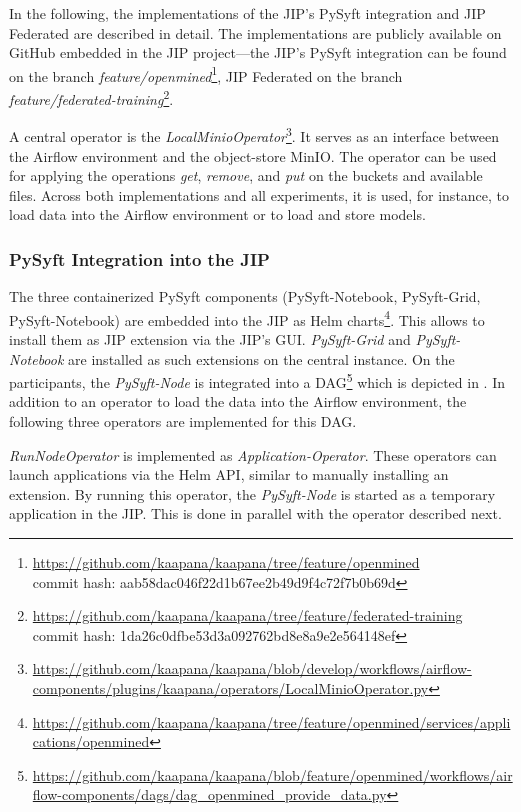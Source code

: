 In the following, the implementations of the JIP's PySyft integration and JIP Federated are described in detail.
The implementations are publicly available on GitHub embedded in the JIP project---the JIP's PySyft integration can be found on the branch \textit{feature/openmined}\footnote{\url{https://github.com/kaapana/kaapana/tree/feature/openmined}\\ commit hash: aab58dac046f22d1b67ee2b49d9f4c72f7b0b69d}, JIP Federated on the branch \textit{feature/federated-training}\footnote{\url{https://github.com/kaapana/kaapana/tree/feature/federated-training}\\ commit hash: 1da26c0dfbe53d3a092762bd8e8a9e2e564148ef}.

A central operator is the \textit{LocalMinioOperator}\footnote{\url{https://github.com/kaapana/kaapana/blob/develop/workflows/airflow-components/plugins/kaapana/operators/LocalMinioOperator.py}}. It serves as an interface between the Airflow environment and the object-store MinIO. The operator can be used for applying the operations \textit{get}, \textit{remove}, and \textit{put} on the buckets and available files. Across both implementations and all experiments, it is used, for instance, to load data into the Airflow environment or to load and store models.

\subsubsection{PySyft Integration into the JIP}

The three containerized PySyft components (PySyft-Notebook, PySyft-Grid, PySyft-Notebook) are embedded into the JIP as Helm charts\footnote{\url{https://github.com/kaapana/kaapana/tree/feature/openmined/services/applications/openmined}}. This allows to install them as JIP extension via the JIP's GUI. \textit{PySyft-Grid} and \textit{PySyft-Notebook} are installed as such extensions on the central instance.
On the participants, the \textit{PySyft-Node} is integrated into a DAG\footnote{\url{https://github.com/kaapana/kaapana/blob/feature/openmined/workflows/airflow-components/dags/dag_openmined_provide_data.py}} which is depicted in . In addition to an operator to load the data into the Airflow environment, the following three operators are implemented for this DAG.

\textit{RunNodeOperator} is implemented as \textit{Application-Operator}. These operators can launch applications via the Helm API, similar to manually installing an extension. By running this operator, the \textit{PySyft-Node} is started as a temporary application in the JIP. This is done in parallel with the operator described next.


